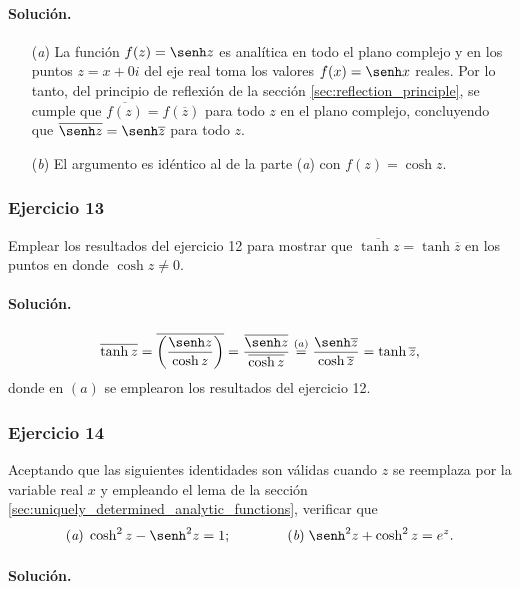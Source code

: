 \documentclass[a4paper]{report}
\begin{document}
\paragraph{Solución.} 
\begin{enumerate}
 \item[(\textit{a})] La función \(f(z)=\senh z\) es analítica en todo el plano complejo y en los puntos \(z=x+0i\) del eje real toma los valores \(f(x)=\senh x\) reales. Por lo tanto, del principio de reflexión de la sección \ref{sec:reflection_principle}, se cumple que \(\overline{f(z)}=f(\overline{z})\) para todo \(z\) en el plano complejo, concluyendo que \(\overline{\senh z}=\senh\overline{z}\) para todo \(z\).
 \item[(\textit{b})] El argumento es idéntico al de la parte (\textit{a}) con \(f(z)=\cosh z\).
\end{enumerate}

\subsubsection{Ejercicio 13}

Emplear los resultados del ejercicio 12 para mostrar que \(\overline{\tanh z}=\tanh\overline{z}\) en los puntos en donde \(\cosh z\neq0\).

\paragraph{Solución.} 
\[
 \overline{\tanh z}=\overline{\left(\frac{\senh z}{\cosh z}\right)}=\frac{\overline{\senh z}}{\overline{\cosh z}}\overset{(a)}{=}\frac{\senh\overline{z}}{\cosh\overline{z}}=\tanh\overline{z},
\]
donde en \((a)\) se emplearon los resultados del ejercicio 12.

\subsubsection{Ejercicio 14}

Aceptando que las siguientes identidades son válidas cuando \(z\) se reemplaza por la variable real \(x\) y empleando el lema de la sección  \ref{sec:uniquely_determined_analytic_functions}, verificar que 
\[
 (\textit{a})\;\cosh^2z-\senh^2z=1;\qquad\qquad (\textit{b})\;\senh^2z+\cosh^2z=e^z.
\]

\paragraph{Solución.} 
\end{document}
